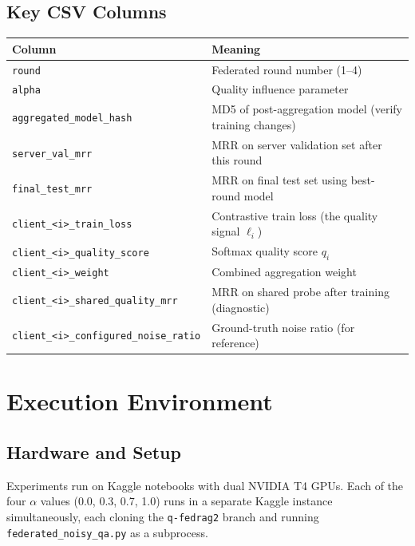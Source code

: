\documentclass[12pt,a4paper]{article}
\begin{document}
\subsection{Key CSV Columns}

\begin{center}
\renewcommand{\arraystretch}{1.3}
\begin{tabular}{lp{9cm}}
\toprule
\textbf{Column} & \textbf{Meaning} \\
\midrule
\texttt{round} & Federated round number (1--4) \\
\texttt{alpha} & Quality influence parameter \\
\texttt{aggregated\_model\_hash} & MD5 of post-aggregation model (verify training changes) \\
\texttt{server\_val\_mrr} & MRR on server validation set after this round \\
\texttt{final\_test\_mrr} & MRR on final test set using best-round model \\
\texttt{client\_<i>\_train\_loss} & Contrastive train loss (the quality signal $\ell_i$) \\
\texttt{client\_<i>\_quality\_score} & Softmax quality score $q_i$ \\
\texttt{client\_<i>\_weight} & Combined aggregation weight \\
\texttt{client\_<i>\_shared\_quality\_mrr} & MRR on shared probe after training (diagnostic) \\
\texttt{client\_<i>\_configured\_noise\_ratio} & Ground-truth noise ratio (for reference) \\
\bottomrule
\end{tabular}
\end{center}

\section{Execution Environment}

\subsection{Hardware and Setup}

Experiments run on Kaggle notebooks with dual NVIDIA T4 GPUs. Each of the four $\alpha$ values (0.0, 0.3, 0.7, 1.0) runs in a separate Kaggle instance simultaneously, each cloning the \texttt{q-fedrag2} branch and running \texttt{federated\_noisy\_qa.py} as a subprocess.
\end{document}
